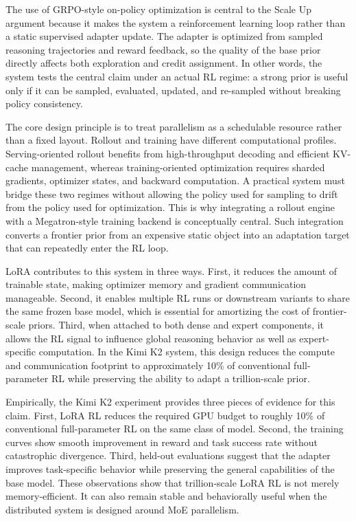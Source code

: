 The use of GRPO-style on-policy optimization is central to the Scale Up argument because it makes the system a reinforcement learning loop rather than a static supervised adapter update. The adapter is optimized from sampled reasoning trajectories and reward feedback, so the quality of the base prior directly affects both exploration and credit assignment. In other words, the system tests the central claim under an actual RL regime: a strong prior is useful only if it can be sampled, evaluated, updated, and re-sampled without breaking policy consistency.

The core design principle is to treat parallelism as a schedulable resource rather than a fixed layout. Rollout and training have different computational profiles. Serving-oriented rollout benefits from high-throughput decoding and efficient KV-cache management, whereas training-oriented optimization requires sharded gradients, optimizer states, and backward computation. A practical system must bridge these two regimes without allowing the policy used for sampling to drift from the policy used for optimization. This is why integrating a rollout engine with a Megatron-style training backend is conceptually central. Such integration converts a frontier prior from an expensive static object into an adaptation target that can repeatedly enter the RL loop.

LoRA contributes to this system in three ways. First, it reduces the amount of trainable state, making optimizer memory and gradient communication manageable. Second, it enables multiple RL runs or downstream variants to share the same frozen base model, which is essential for amortizing the cost of frontier-scale priors. Third, when attached to both dense and expert components, it allows the RL signal to influence global reasoning behavior as well as expert-specific computation. In the Kimi K2 system, this design reduces the compute and communication footprint to approximately 10\% of conventional full-parameter RL while preserving the ability to adapt a trillion-scale prior.

Empirically, the Kimi K2 experiment provides three pieces of evidence for this claim. First, LoRA RL reduces the required GPU budget to roughly 10\% of conventional full-parameter RL on the same class of model. Second, the training curves show smooth improvement in reward and task success rate without catastrophic divergence. Third, held-out evaluations suggest that the adapter improves task-specific behavior while preserving the general capabilities of the base model. These observations show that trillion-scale LoRA RL is not merely memory-efficient. It can also remain stable and behaviorally useful when the distributed system is designed around MoE parallelism.

